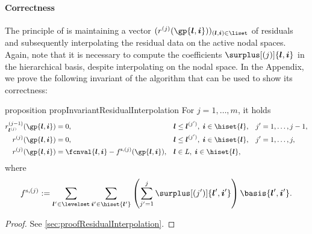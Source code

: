 \paragraph{Correctness}

The principle of  is maintaining
a vector $(r^{(j)}(\gp{\*l,\*i}))_{(\*l,\*i) \in \liset}$ of residuals
and subsequently interpolating the residual data on the active nodal spaces.
Again, note that it is necessary to compute the coefficients
$\surplus[(j)]{\*l,\*i}$ in the hierarchical basis, despite interpolating
on the nodal space.
In the Appendix, we prove the following invariant of the algorithm that
can be used to show its correctness:

\begin{restatable}{%
  proposition%
}{%
  propInvariantResidualInterpolation%
}
  \label{prop:invariantResidualInterpolation}
  For $j = 1, \dotsc, m$, it holds
  \begin{subequations}
    \label{eq:propInvariantResidualInterpolationStatements}
    \begin{align}
      \label{eq:propInvariantResidualInterpolation1}
      r_{\*l^{(j)}}^{(j-1)}(\gp{\*l,\*i})
      &= 0,
      &&\*l \le \*l^{(j')},\; \*i \in \hiset{\*l},
      &j'
      &= 1, \dotsc, j - 1,\\
      \label{eq:propInvariantResidualInterpolation2}
      r^{(j)}(\gp{\*l,\*i})
      &= 0,
      &&\*l \le \*l^{(j')},\; \*i \in \hiset{\*l},
      &j'
      &= 1, \dotsc, j,\\
      \label{eq:propInvariantResidualInterpolation3}
      r^{(j)}(\gp{\*l,\*i})
      &= \fcnval{\*l,\*i} - f^{\sparse,(j)}(\gp{\*l,\*i}),
      &&\*l \in L,\; \*i \in \hiset{\*l},&&
    \end{align}
  \end{subequations}
  where
  \begin{equation}
    \label{eq:propInvariantResidualInterpolation4}
    f^{\sparse,(j)}
    := \sum_{\*l' \in \levelset} \sum_{\*i' \in \hiset{\*l'}}
    \left(\sum_{j'=1}^{j} \surplus[(j')]{\*l',\*i'}\right) \basis{\*l',\*i'}.
  \end{equation}
\end{restatable}

\begin{proof}
  See \cref{sec:proofResidualInterpolation}.
\end{proof}

